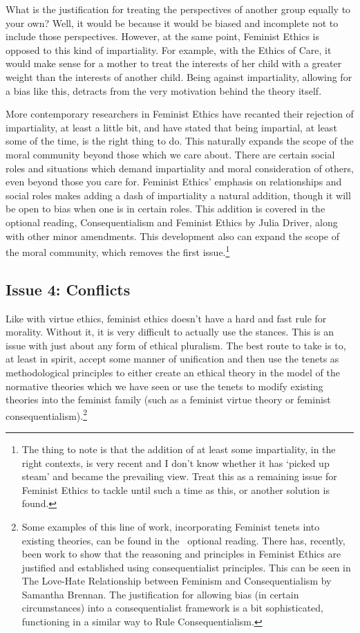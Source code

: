 What is the justification for treating the perspectives of another group equally to your own? Well, it would be because it would be biased and incomplete not to include those perspectives. However, at the same point, Feminist Ethics is opposed to this kind of impartiality. For example, with the Ethics of Care, it would make sense for a mother to treat the interests of her child with a greater weight than the interests of another child. Being against impartiality, allowing for a bias like this, detracts from the very motivation behind the theory itself. 

More contemporary researchers in Feminist Ethics have recanted their rejection of impartiality, at least a little bit, and have stated that being impartial, at least some of the time, is the right thing to do. This naturally expands the scope of the moral community beyond those which we care about. There are certain social roles and situations which demand impartiality and moral consideration of others, even beyond those you care for. Feminist Ethics' emphasis on relationships and social roles makes adding a dash of impartiality a natural addition, though it will be open to bias when one is in certain roles. This addition is covered in the optional reading, Consequentialism and Feminist Ethics by Julia Driver, along with other minor amendments. This development also can expand the scope of the moral community, which removes the first issue.\footnote{The thing to note is that the addition of at least some impartiality, in the right contexts, is very recent and I don't know whether it has `picked up steam' and became the prevailing view. Treat this as a remaining issue for Feminist Ethics to tackle until such a time as this, or another solution is found.}

\subsection{Issue 4: Conflicts}

Like with virtue ethics, feminist ethics doesn’t have a hard and fast rule for morality. Without it, it is very difficult to actually use the stances. This is an issue with just about any form of ethical pluralism. The best route to take is to, at least in spirit, accept some manner of unification and then use the tenets as methodological principles to either create an ethical theory in the model of the normative theories which we have seen or use the tenets to modify existing theories into the feminist family (such as a feminist virtue theory or feminist consequentialism).\footnote{Some examples of this line of work, incorporating Feminist tenets into existing theories, can be found in the  optional reading. There has, recently, been work to show that the reasoning and principles in Feminist Ethics are justified and established using consequentialist principles. This can be seen in The Love-Hate Relationship between Feminism and Consequentialism by Samantha Brennan. The justification for allowing bias (in certain circumstances) into a consequentialist framework is a bit sophisticated, functioning in a similar way to Rule Consequentialism.}

